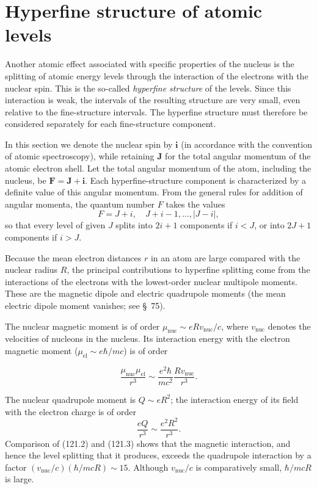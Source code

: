 \section{Hyperfine structure of atomic levels}

Another atomic effect associated with specific properties of the nucleus is
the splitting of atomic energy levels through the interaction of the
electrons with the nuclear spin. This is the so-called \emph{hyperfine
structure} of the levels. Since this interaction is weak, the intervals of
the resulting structure are very small, even relative to the fine-structure
intervals. The hyperfine structure must therefore be considered separately
for each fine-structure component.

In this section we denote the nuclear spin by $\mathbf i$ (in accordance with
the convention of atomic spectroscopy), while retaining $\mathbf J$ for the
total angular momentum of the atomic electron shell. Let the total angular
momentum of the atom, including the nucleus, be
$\mathbf F=\mathbf J+\mathbf i$. Each hyperfine-structure component is
characterized by a definite value of this angular momentum. From the general
rules for addition of angular momenta, the quantum number $F$ takes the values
\begin{equation}
 F=J+i,\quad J+i-1,\ldots,|J-i|,
 \tag{121.1}
\end{equation}
so that every level of given $J$ splits into $2i+1$ components if $i<J$, or
into $2J+1$ components if $i>J$.

Because the mean electron distances $r$ in an atom are large compared with
the nuclear radius $R$, the principal contributions to hyperfine splitting
come from the interactions of the electrons with the lowest-order nuclear
multipole moments. These are the magnetic dipole and electric quadrupole
moments (the mean electric dipole moment vanishes; see \S~75).

The nuclear magnetic moment is of order
$\mu_{\text{nuc}}\sim eRv_{\text{nuc}}/c$, where $v_{\text{nuc}}$ denotes
the velocities of nucleons in the nucleus. Its interaction energy with the
electron magnetic moment ($\mu_{\text{el}}\sim e\hbar/mc$) is of order

\begin{equation}
 \frac{\mu_{\text{nuc}}\mu_{\text{el}}}{r^3}
 \sim\frac{e^2\hbar}{mc^2}\frac{Rv_{\text{nuc}}}{r^3}.
 \tag{121.2}
\end{equation}

The nuclear quadrupole moment is $Q\sim eR^2$; the interaction energy of its
field with the electron charge is of order
\begin{equation}
 \frac{eQ}{r^3}\sim\frac{e^2R^2}{r^3}.
 \tag{121.3}
\end{equation}
Comparison of (121.2) and (121.3) shows that the magnetic interaction, and
hence the level splitting that it produces, exceeds the quadrupole
interaction by a factor
$(v_{\text{nuc}}/c)(\hbar/mcR)\sim15$. Although $v_{\text{nuc}}/c$ is
comparatively small, $\hbar/mcR$ is large.


